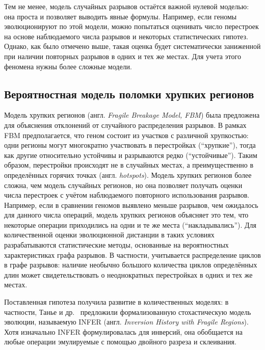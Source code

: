 Тем не менее, модель случайных разрывов остаётся важной нулевой моделью: она проста и позволяет выводить явные формулы.
Например, если геномы эволюционируют по этой модели, можно попытаться оценивать число перестроек на основе наблюдаемого числа разрывов и некоторых статистических гипотез.
Однако, как было отмечено выше, такая оценка будет систематически заниженной при наличии повторных разрывов в одних и тех же местах.
Для учета этого феномена нужны более сложные модели.

\subsection{Вероятностная модель поломки хрупких регионов}
\label{subsec:fragile_breakage}

Модель хрупких регионов (англ. \textit{Fragile Breakage Model, FBM}) была предложена для объяснения отклонений от случайного распределения разрывов.
В рамках FBM предполагается, что геном состоит из участков с различной хрупкостью: одни регионы могут многократно участвовать в перестройках (``хрупкие''), тогда как другие относительно устойчивы и разрываются редко (``устойчивые'').
Таким образом, перестройки происходят не в случайных местах, а преимущественно в определённых горячих точках (англ. \textit{hotspots}).
Модель хрупких регионов более сложна, чем модель случайных регионов, но она позволяет получать оценки числа перестроек с учётом наблюдаемого повторного использования разрывов.
Например, если в сравнении геномов выявлено меньше разрывов, чем ожидалось для данного числа операций, модель хрупких регионов объясняет это тем, что некоторые операции приходились на одни и те же места (``накладывались'').
Для количественной оценки эволюционной дистанции в таких условиях разрабатываются статистические методы, основанные на вероятностных характеристиках графа разрывов.
В частности, учитывается распределение циклов в графе разрывов: наличие необычно большого количества циклов определённых длин может свидетельствовать о неоднократных перестройках в одних и тех же местах.


Поставленная гипотеза получила развитие в количественных моделях: в частности, Танье и др.~\cite{tannier2016} предложили формализованную стохастическую модель эволюции, называемую INFER (англ. \textit{Inversion History with Fragile Regions}).
Хотя изначально INFER формулировалась для инверсий, она обобщается на любые операции эмулируемые с помощью двойного разреза и склеивания.

